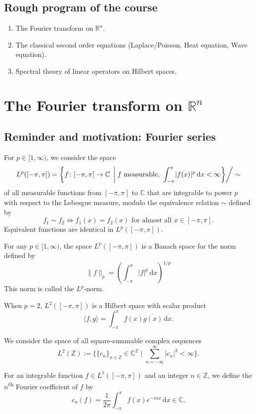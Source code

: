 \documentclass[12pt, oneside, a4paper]{article}
\theoremstyle{dfn}
\newcommand{\scalprod}[2]{\langle #1,#2 \rangle}
\providecommand{\Lper}[1]{L^{#1}([-\pi,\pi])}
\def\Rbb{\ensuremath{\mathbb{R}}}
\def\Zbb{\ensuremath{\mathbb{Z}}}
\def\dx{\,\mathrm dx}
\providecommand{\norm}[1]{\lVert#1\rVert}
\newcommand{\Com}{\mathbb{C}}
\providecommand{\abs}[1]{\lvert#1\rvert}
\begin{document}
\subsection*{Rough program of the course}

\begin{enumerate}
	\item The Fourier transform on $\Rbb^n$.
	\item The classical second order equations (Laplace/Poisson, Heat equation, Wave equation).
	\item Spectral theory of linear operators on Hilbert spaces.
\end{enumerate}

\section{The Fourier transform on $\Rbb^n$}
\subsection{Reminder and motivation: Fourier series}\label{sec:FourierSeries}

For $p \in [1,\infty)$, we consider the space
\[
L^p([-\pi,\pi]) = \left\{ f \colon [-\pi,\pi] \to \Com \;\left|\; \text{$f$ measurable, } \int_{-\pi}^\pi \abs{f(x)}^p \dx < \infty \right\} \right/ \sim
\]
of all measurable functions from $[-\pi,\pi]$ to $\Com$ that are integrable to power $p$ with respect to the Lebesgue measure, modulo the equivalence relation $\sim$ defined by
\[
f_1 \sim f_2 \iff f_1(x) = f_2(x) \text{ for almost all $x \in [-\pi,\pi]$.}
\]
Equivalent functions are identical in $\Lper{p}$.

For any $p\in [1,\infty)$, the space $\Lper{p}$ is a Banach space for the norm defined by
\[
\norm{f}_p = \left( \int_{-\pi}^\pi \abs{f}^p \dx \right)^{1/p}
\]
This norm is called the $L^p$-norm.

When $p = 2$, $\Lper{2}$ is a Hilbert space with scalar product
\[
\scalprod{f}{g} = \int_{-\pi}^\pi f(x) \overline{g(x)} \dx.
\]

We consider the space of all square-summable complex sequences
\[
L^2(\Zbb) := \bigg\{ \{c_n\}_{n \in \Zbb} \in \Com^\Zbb \;\bigg|\; \sum_{n=-\infty}^\infty \abs{c_n}^2 < \infty \bigg\}.
\]

For an integrable function $f \in \Lper{1}$ and an integer $n \in \Zbb$, we define the $n$\textsuperscript{th} Fourier coefficient of $f$ by
\[
c_n(f) = \frac{1}{2\pi} \int_{-\pi}^\pi f(x) e^{-inx} \dx \in \Com.
\]
\end{document}
